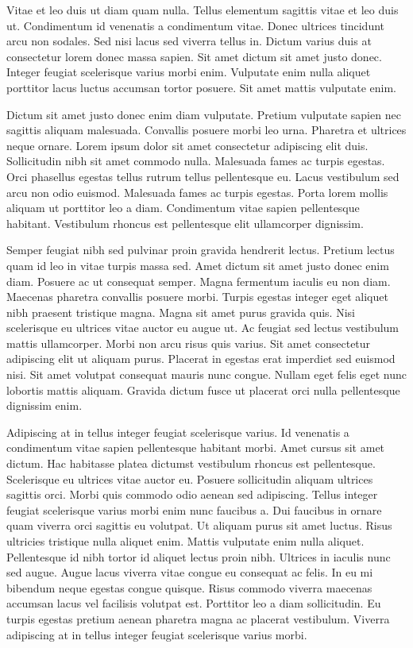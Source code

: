 \documentclass[11pt,a4paper]{article}
\begin{document}
Vitae et leo duis ut diam quam nulla. Tellus elementum sagittis vitae et leo duis ut. Condimentum id venenatis a condimentum vitae. Donec ultrices tincidunt arcu non sodales. Sed nisi lacus sed viverra tellus in. Dictum varius duis at consectetur lorem donec massa sapien. Sit amet dictum sit amet justo donec. Integer feugiat scelerisque varius morbi enim. Vulputate enim nulla aliquet porttitor lacus luctus accumsan tortor posuere. Sit amet mattis vulputate enim.

Dictum sit amet justo donec enim diam vulputate. Pretium vulputate sapien nec sagittis aliquam malesuada. Convallis posuere morbi leo urna. Pharetra et ultrices neque ornare. Lorem ipsum dolor sit amet consectetur adipiscing elit duis. Sollicitudin nibh sit amet commodo nulla. Malesuada fames ac turpis egestas. Orci phasellus egestas tellus rutrum tellus pellentesque eu. Lacus vestibulum sed arcu non odio euismod. Malesuada fames ac turpis egestas. Porta lorem mollis aliquam ut porttitor leo a diam. Condimentum vitae sapien pellentesque habitant. Vestibulum rhoncus est pellentesque elit ullamcorper dignissim.

Semper feugiat nibh sed pulvinar proin gravida hendrerit lectus. Pretium lectus quam id leo in vitae turpis massa sed. Amet dictum sit amet justo donec enim diam. Posuere ac ut consequat semper. Magna fermentum iaculis eu non diam. Maecenas pharetra convallis posuere morbi. Turpis egestas integer eget aliquet nibh praesent tristique magna. Magna sit amet purus gravida quis. Nisi scelerisque eu ultrices vitae auctor eu augue ut. Ac feugiat sed lectus vestibulum mattis ullamcorper. Morbi non arcu risus quis varius. Sit amet consectetur adipiscing elit ut aliquam purus. Placerat in egestas erat imperdiet sed euismod nisi. Sit amet volutpat consequat mauris nunc congue. Nullam eget felis eget nunc lobortis mattis aliquam. Gravida dictum fusce ut placerat orci nulla pellentesque dignissim enim.

Adipiscing at in tellus integer feugiat scelerisque varius. Id venenatis a condimentum vitae sapien pellentesque habitant morbi. Amet cursus sit amet dictum. Hac habitasse platea dictumst vestibulum rhoncus est pellentesque. Scelerisque eu ultrices vitae auctor eu. Posuere sollicitudin aliquam ultrices sagittis orci. Morbi quis commodo odio aenean sed adipiscing. Tellus integer feugiat scelerisque varius morbi enim nunc faucibus a. Dui faucibus in ornare quam viverra orci sagittis eu volutpat. Ut aliquam purus sit amet luctus. Risus ultricies tristique nulla aliquet enim. Mattis vulputate enim nulla aliquet. Pellentesque id nibh tortor id aliquet lectus proin nibh. Ultrices in iaculis nunc sed augue. Augue lacus viverra vitae congue eu consequat ac felis. In eu mi bibendum neque egestas congue quisque. Risus commodo viverra maecenas accumsan lacus vel facilisis volutpat est. Porttitor leo a diam sollicitudin. Eu turpis egestas pretium aenean pharetra magna ac placerat vestibulum. Viverra adipiscing at in tellus integer feugiat scelerisque varius morbi.
\end{document}
